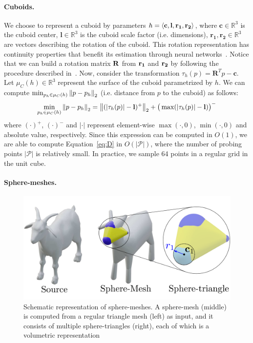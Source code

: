 \paragraph*{Cuboids.}
We choose to represent a cuboid by parameters
$h = \langle\bf c, \bf l , \bf r_1, \bf r_2\rangle$, where $\mathbf{c} \in \mathbb{R}^3$ is the cuboid center, $\mathbf{l} \in \mathbb{R}^3$ is the cuboid scale factor (i.e. dimensions), $\mathbf{r_1}, \mathbf{r_2} \in \mathbb{R}^3$ are vectors describing the
rotation of the cuboid.
This rotation representation has continuity properties that benefit
its estimation through neural networks~\cite{nnrotation}.
Notice that we can build a rotation matrix $\bf R$ from $\bf r_1$ and $\bf r_2$
by following the procedure described in~\cite{nnrotation}.
Now, consider the transformation $\tau_h(p) = \mathbf{R}^Tp - \mathbf{c}$.
Let $\mu_C(h) \in \mathbb{R}^3$ represent the surface of the cuboid parametrized by $h$. We can compute $\min_{p_h \in \mu_C(h)}\left\lVert p-p_h\right\rVert_2$
(i.e. distance from $p$ to the cuboid) as follows: %
$$
\min_{p_h \in \mu_C(h)}\left\lVert p-p_h\right\rVert_2 = 
\left\lVert(|\tau_h(p)| - \bf l)^+\right\rVert_2 + \big(\max(|\tau_h(p)| - \mathbf{l})\big)^-
$$
where $(\cdot)^+$, $(\cdot)^-$ and $|\cdot|$ represent element-wise $\max(\cdot, 0)$, $\min(\cdot, 0)$ and absolute value, respectively.
Since this expression can be computed in $O(1)$, 
we are able to compute Equation~\ref{eq:D} in $O(|\mathcal{P}|)$, where the number of probing points $|\mathcal{P}|$ is relatively small.
In practice, we sample 64 points in a regular grid
in the unit cube.

\paragraph*{Sphere-meshes.}

\begin{figure}
\centering
\includegraphics[width=0.8\linewidth]{handles/imgs/spheremesh_explained.pdf}
\caption{\label{fig:spheremesh} \small
Schematic representation of sphere-meshes.
A sphere-mesh (middle) is computed from a regular triangle mesh (left) as input, and it consists of multiple sphere-triangles (right), each of which is a volumetric representation}
\end{figure}

